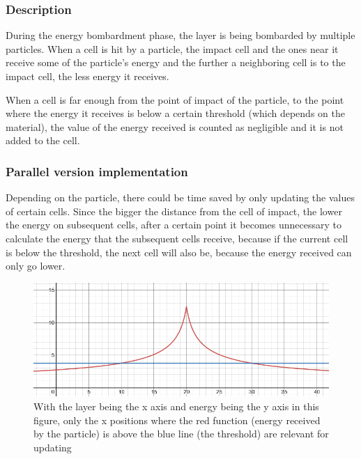 \subsubsection{Description}

During the energy bombardment phase, the layer is being bombarded by multiple particles. When a cell is hit by a particle, the impact cell and the ones near it receive some of the particle's energy and the further a neighboring cell is to the impact cell, the less energy it receives.

When a cell is far enough from the point of impact of the particle, to the point where the energy it receives is below a certain threshold (which depends on the material), the value of the energy received is counted as negligible and it is not added to the cell.

\subsubsection{Parallel version implementation}

Depending on the particle, there could be time saved by only updating the values of certain cells. Since the bigger the distance from the cell of impact, the lower the energy on subsequent cells, after a certain point it becomes unnecessary to calculate the energy that the subsequent cells receive, because if the current cell is below the threshold, the next cell will also be, because the energy received can only go lower.

\begin{figure}[h]
    \centering
    \includegraphics[scale=0.4]{images/Threshold.png}
    \caption{With the layer being the x axis and energy being the y axis in this figure, only the x positions where the red function (energy received by the particle) is above the blue line (the threshold) are relevant for updating}
    \label{fig:my_label}
\end{figure}



